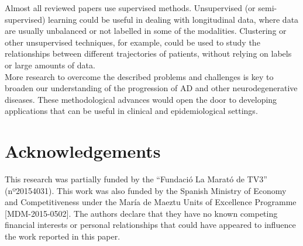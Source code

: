 Almost all reviewed papers use supervised methods. Unsupervised (or semi-supervised) learning could be useful in dealing with longitudinal data, where data are usually unbalanced or not labelled in some of the modalities. Clustering or other unsupervised techniques, for example, could be used to study the relationships between different trajectories of patients, without relying on labels or large amounts of data.  \\

More research to overcome the described problems and challenges is key to broaden our understanding of the progression of AD and other neurodegenerative diseases. These methodological advances would open the door to developing applications that can be useful in clinical and epidemiological settings.

\section*{Acknowledgements}
This research was partially funded by the “Fundació La Marató de TV3” (nº20154031). This work was also funded by the Spanish Ministry of Economy and Competitiveness under the María de Maeztu Units of Excellence Programme [MDM-2015-0502]. The authors declare that they have no known competing financial interests or personal relationships that could have appeared to influence the work reported in this paper.\\